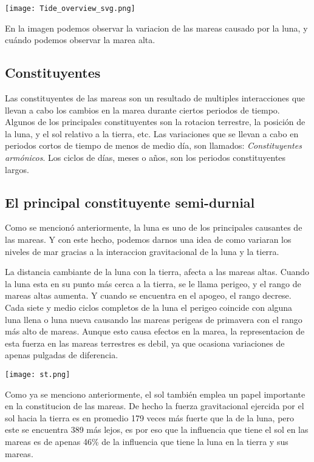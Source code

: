 \documentclass[12pt]{article}
\begin{document}
\begin{center}
\texttt{[image: Tide\_overview\_svg.png]}
\end{center}

En la imagen podemos observar la variacion de las mareas causado por la luna, y cuándo podemos observar la marea alta. 

\subsection{Constituyentes}
Las constituyentes de las mareas son un resultado de multiples interacciones que llevan a cabo los cambios en la marea durante ciertos periodos de tiempo. Algunos de los principales constituyentes son la rotacion terrestre, la posición de la luna, y el sol relativo a la tierra, etc. Las variaciones que se llevan a cabo en periodos cortos de tiempo de menos de medio día, son llamados: \textit{Constituyentes armónicos}. Los ciclos de días, meses o años, son los periodos constituyentes largos.
\pagebreak
\subsection{El principal constituyente semi-durnial}
Como se mencionó anteriormente, la luna es uno de los principales causantes de las mareas. Y con este hecho, podemos darnos una idea de como variaran los niveles de mar gracias a la interaccion gravitacional de la luna y la tierra. 

La distancia cambiante de la luna con la tierra, afecta a las mareas altas. Cuando la luna esta en su punto más cerca a la tierra, se le llama perigeo, y el rango de mareas altas aumenta. Y cuando se encuentra en el apogeo, el rango decrese. Cada siete y medio ciclos completos de la luna el perigeo coincide con alguna luna llena o luna nueva causando las mareas perigeas de primavera con el rango más alto de mareas. Aunque esto causa efectos en la marea, la representacion de esta fuerza en las mareas terrestres es debil, ya que ocasiona variaciones de apenas pulgadas de diferencia.  
\begin{center}
\texttt{[image: st.png]}
\end{center}
Como ya se menciono anteriormente, el sol también emplea un papel importante en la constitucion de las mareas. De hecho la fuerza gravitacional ejercida por el sol hacia la tierra es en promedio 179 veces más fuerte que la de la luna, pero este se encuentra 389 más lejos, es por eso que la influencia que tiene el sol en las mareas es de apenas 46\% de la influencia que tiene la luna en la tierra y sus mareas. 
\pagebreak
\end{document}
